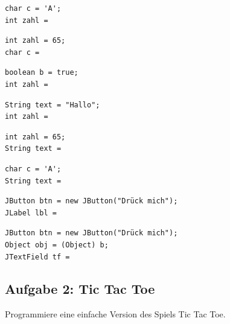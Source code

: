 \begin{compactenum}[a)]
\item 
\begin{lstlisting}
char c = 'A';
int zahl = 
\end{lstlisting}

\item 
\begin{lstlisting}
int zahl = 65;
char c =
\end{lstlisting}

\item 
\begin{lstlisting}
boolean b = true;
int zahl =
\end{lstlisting}

\item 
\begin{lstlisting}
String text = "Hallo";
int zahl =
\end{lstlisting}

\item 
\begin{lstlisting}
int zahl = 65;
String text =
\end{lstlisting}

\item 
\begin{lstlisting}
char c = 'A';
String text =
\end{lstlisting}

\item 
\begin{lstlisting}
JButton btn = new JButton("Drück mich");
JLabel lbl =
\end{lstlisting}

\item 
\begin{lstlisting}
JButton btn = new JButton("Drück mich");
Object obj = (Object) b;
JTextField tf =
\end{lstlisting}
\end{compactenum}


\subsection{Aufgabe 2: Tic Tac Toe}

Programmiere eine einfache Version des Spiels Tic Tac Toe.

